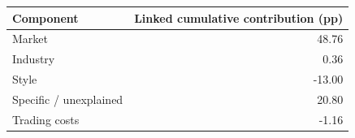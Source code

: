 \begin{tabular}{lr}
\toprule
Component & Linked cumulative contribution (pp) \\
\midrule
Market & 48.76 \\
Industry & 0.36 \\
Style & -13.00 \\
Specific / unexplained & 20.80 \\
Trading costs & -1.16 \\
\bottomrule
\end{tabular}
